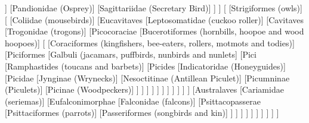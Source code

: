 \documentclass[tikz]{standalone}
\begin{document}
\begin{forest}
										]
										[{Pandionidae (Osprey)}]
										[{Sagittariidae (Secretary Bird)}]
									]
								]
								[
									[{Strigiformes (owls)}]
							   		[
							      			[{Coliidae (mousebirds)}]
							      			[{Eucavitaves}
											[{Leptosomatidae (cuckoo roller)}]
										 	[{Cavitaves}
												[{Trogonidae (trogons)}]
												[{Picocoraciae}
											    		[{Bucerotiformes (hornbills, hoopoe and wood hoopoes)}]
											       		[
											       			[{Coraciformes (kingfishers, bee-eaters, rollers, motmots and todies)}]
														[{Piciformes}
															[{Galbuli (jacamars, puffbirds, nunbirds and nunlets}]
															[Pici
																[{Ramphastides (toucans and barbets)}]
																[{Picides}
																	[{Indicatoridae (Honeyguides)}]
																	[{Picidae}
																		[{Jynginae (Wrynecks)}]
																		[{Nesoctitinae (Antillean Piculet)}]
																		[{Picumninae (Piculets)}]
																		[{Picinae (Woodpeckers)}]
																	]
																]
															]
														]
								       					]
												]	
											]
										]
									]
								]
							]
						     	[{Australaves}
						     		[{Cariamidae (seriemas)}]
								[{Eufalconimorphae}
									[{Falconidae (falcons)}]
							   		[{Psittacopasserae}
							   			[{Psittaciformes (parrots)}]
							    			[{Passeriformes (songbirds and kin)}]
									]
								]
							]
						]
					]
				]
			]	
		]
	]
]
\end{forest}
\end{document}
